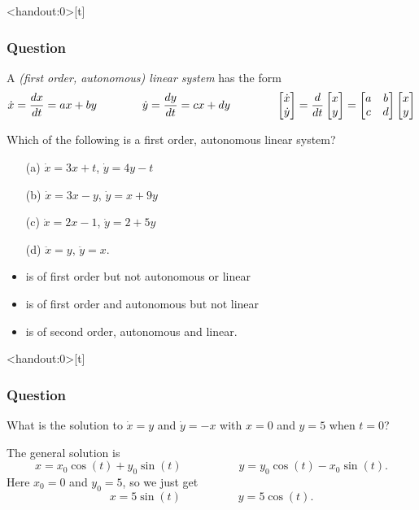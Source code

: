 \documentclass[9pt]{beamer}
\begin{document}
\begin{frame}<handout:0>[t]
 \frametitle{Question}
 A \emph{(first order, autonomous) linear system} has the form
 \[ \dot{x} = \frac{dx}{dt} = ax + by \hspace{4em}
    \dot{y} = \frac{dy}{dt} = cx + dy \hspace{4em} 
    \left[\begin{matrix} \dot{x}\\\dot{y}\end{matrix}\right] =
     \frac{d}{dt}\left[\begin{matrix} x\\ y\end{matrix}\right] =
     \left[\begin{matrix} a&b \\ c&d\end{matrix}\right] \left[\begin{matrix} x\\ y\end{matrix}\right]
 \]

 \reminderbar
 
 Which of the following is a first order, autonomous linear system?
 \begin{itemize}
  \item[(a)] $\dot{x}=3x+t$, $\dot{y}=4y-t$
  \item[(b)] $\dot{x}=3x-y$, $\dot{y}=x+9y$
  \item[(c)] $\dot{x}=2x-1$, $\dot{y}=2+5y$
  \item[(d)] $\ddot{x}=y$, $\ddot{y}=x$.
 \end{itemize}

 \begin{itemize}
  \item<3->[(a)] is of first order but not autonomous or linear
  \item<4->[(c)] is of first order and autonomous but not linear
  \item<5->[(d)] is of second order, autonomous and linear.
 \end{itemize}
\end{frame}

\begin{frame}<handout:0>[t]
 \frametitle{Question}

 What is the solution to $\dot{x}=y$ and $\dot{y}=-x$ with 
 $x=0$ and $y=5$ when $t=0$?

 \bigskip\pause

 The general solution is 
 \[ x = x_0\cos(t)+y_0\sin(t) \hspace{5em}
    y = y_0\cos(t)-x_0\sin(t).
 \]
 \pause
 Here $x_0=0$ and $y_0=5$, so we just get
 \[ x = 5\sin(t) \hspace{5em}
    y = 5\cos(t).
 \]
\end{frame}
\end{document}
